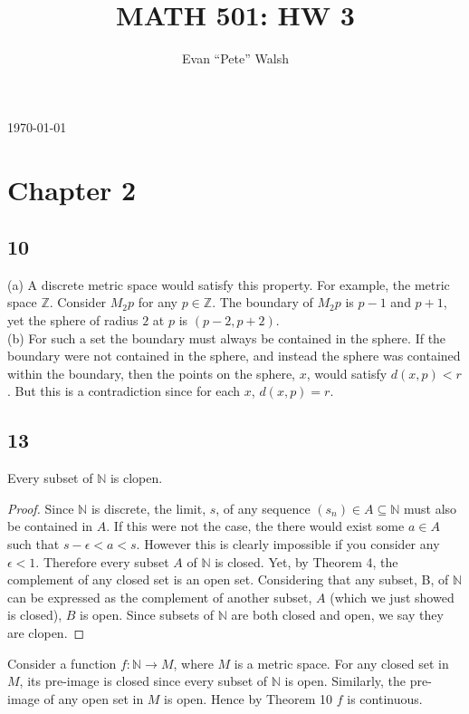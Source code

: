\documentclass[11pt]{amsart}
\begin{document}
\title{MATH 501: HW 3}
\author{Evan ``Pete'' Walsh}
\today
\maketitle

\section*{Chapter 2}

\subsection*{10} (a) A discrete metric space would satisfy this property. For example, the metric space $\mathbb{Z}$. Consider $M_{2}p$ for any $p\in\mathbb{Z}$. The boundary of $M_{2}p$ is $p-1$ and $p+1$, yet the sphere of radius $2$ at $p$ is $(p-2, p+2)$. \\

(b) For such a set the boundary must always be contained in the sphere. If the boundary were not contained in the sphere, and instead the sphere was contained within the boundary, then the points on the sphere, $x$, would satisfy $d(x,p) < r$. But this is a contradiction since for each $x$, $d(x,p) = r$. 



\subsection*{13} Every subset of $\mathbb{N}$ is clopen.

\begin{proof}
  Since $\mathbb{N}$ is discrete, the limit, $s$, of any sequence $(s_{n}) \in A\subseteq \mathbb{N}$ must also be contained in $A$. If this were not the case, the there would exist some $a \in A$ such that $s - \epsilon < a < s$. However this is clearly impossible if you consider any $\epsilon < 1$. Therefore every subset $A$ of $\mathbb{N}$ is closed. Yet, by Theorem 4, the complement of any closed set is an open set. Considering that any subset, B, of $\mathbb{N}$ can be expressed as the complement of another subset, $A$ (which we just showed is closed), $B$ is open. Since subsets of $\mathbb{N}$ are both closed and open, we say they are clopen.
\end{proof}

Consider a function $f:\mathbb{N}\rightarrow M$, where $M$ is a metric space. For any closed set in $M$, its pre-image is closed since every subset of $\mathbb{N}$ is open. Similarly, the pre-image of any open set in $M$ is open. Hence by Theorem 10 $f$ is continuous. 
\end{document}
